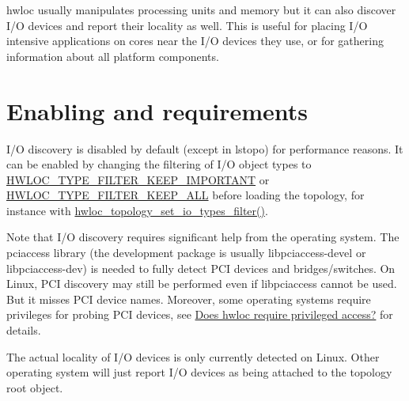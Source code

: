 

hwloc usually manipulates processing units and memory but it can also discover I/O devices and report their locality as well. This is useful for placing I/O intensive applications on cores near the I/O devices they use, or for gathering information about all platform components.

 \hypertarget{a00384_iodevices_enabling}{}\section{Enabling and requirements}\label{a00384_iodevices_enabling}
I/O discovery is disabled by default (except in lstopo) for performance reasons. It can be enabled by changing the filtering of I/O object types to {\ttfamily \hyperlink{a00193_gga9a5a1f0140cd1952544477833733195ba63fd24954e18c83ff7eae9588759adb5}{H\+W\+L\+O\+C\+\_\+\+T\+Y\+P\+E\+\_\+\+F\+I\+L\+T\+E\+R\+\_\+\+K\+E\+E\+P\+\_\+\+I\+M\+P\+O\+R\+T\+A\+NT}} or {\ttfamily \hyperlink{a00193_gga9a5a1f0140cd1952544477833733195bafda7b59e6810dfe778d8f9a4cc1e350e}{H\+W\+L\+O\+C\+\_\+\+T\+Y\+P\+E\+\_\+\+F\+I\+L\+T\+E\+R\+\_\+\+K\+E\+E\+P\+\_\+\+A\+LL}} before loading the topology, for instance with {\ttfamily \hyperlink{a00193_ga0ab38705357bc1203abe829da8a12ad3}{hwloc\+\_\+topology\+\_\+set\+\_\+io\+\_\+types\+\_\+filter()}}.

Note that I/O discovery requires significant help from the operating system. The pciaccess library (the development package is usually {\ttfamily libpciaccess-\/devel} or {\ttfamily libpciaccess-\/dev}) is needed to fully detect P\+CI devices and bridges/switches. On Linux, P\+CI discovery may still be performed even if {\ttfamily libpciaccess} cannot be used. But it misses P\+CI device names. Moreover, some operating systems require privileges for probing P\+CI devices, see \hyperlink{a00394_faq_privileged}{Does hwloc require privileged access?} for details.

The actual locality of I/O devices is only currently detected on Linux. Other operating system will just report I/O devices as being attached to the topology root object.

